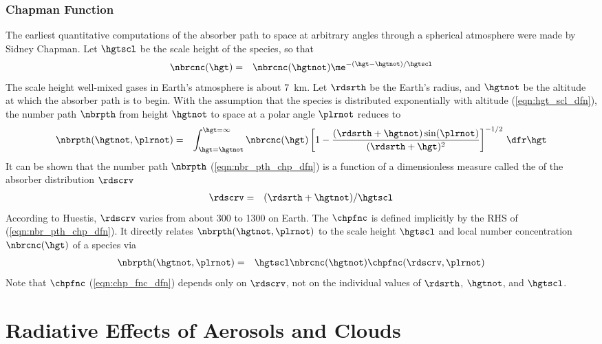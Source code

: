 \documentclass[12pt]{article}
\begin{document}
\subsubsection[Chapman Function]{Chapman Function}\label{sxn:chp_fnc}
The earliest quantitative computations of the absorber path to space
at arbitrary angles through a spherical atmosphere were made by Sidney
Chapman. 
Let $\hgtscl$ be the scale height of the species, so that
\begin{eqnarray}
\nbrcnc(\hgt) & = & \nbrcnc(\hgtnot) \me^{-(\hgt-\hgtnot)/\hgtscl}
\label{eqn:hgt_scl_dfn}
\end{eqnarray}
The scale height well-mixed gases in Earth's atmosphere is about
7~km. 
Let $\rdsrth$ be the Earth's radius, and $\hgtnot$ be the altitude at
which the absorber path is to begin.
With the assumption that the species is distributed exponentially
with altitude (\ref{eqn:hgt_scl_dfn}), the number path $\nbrpth$ from
height $\hgtnot$ to space at a polar angle $\plrnot$ reduces to 
\begin{eqnarray}
\nbrpth(\hgtnot,\plrnot) & = & \int_{\hgt=\hgtnot}^{\hgt=\infty} 
\nbrcnc(\hgt) \left[ 
1 - \frac{(\rdsrth+\hgtnot) \sin(\plrnot)}{(\rdsrth+\hgt)^{2}}
\right]^{-1/2} \,\dfr\hgt \nonumber
\label{eqn:nbr_pth_chp_dfn}
\end{eqnarray}
It can be shown that the number path $\nbrpth$
(\ref{eqn:nbr_pth_chp_dfn}) is a function of a dimensionless 
measure called the  of the absorber  
distribution $\rdscrv$ 
\begin{eqnarray}
\rdscrv & = & (\rdsrth+\hgtnot)/\hgtscl 
\label{eqn:rds_crv_dfn}
\end{eqnarray}
According to Huestis, $\rdscrv$ varies from about 300 to 1300 on
Earth. 
The  $\chpfnc$ \cite[e.g.,][]{Ree89} 
is defined implicitly by the RHS of (\ref{eqn:nbr_pth_chp_dfn}).
It directly relates $\nbrpth(\hgtnot,\plrnot)$ to the scale height
$\hgtscl$ and local number concentration $\nbrcnc(\hgt)$ of a
species via
\begin{eqnarray}
\nbrpth(\hgtnot,\plrnot) & = & \hgtscl \nbrcnc(\hgtnot)
\chpfnc(\rdscrv,\plrnot)
\label{eqn:chp_fnc_dfn}
\end{eqnarray}
Note that $\chpfnc$ (\ref{eqn:chp_fnc_dfn}) depends only on $\rdscrv$,  
not on the individual values of $\rdsrth$, $\hgtnot$, and $\hgtscl$.

\section[Radiative Effects of Aerosols and Clouds]{Radiative Effects of Aerosols and Clouds}\label{sxn:aer}
\end{document}
